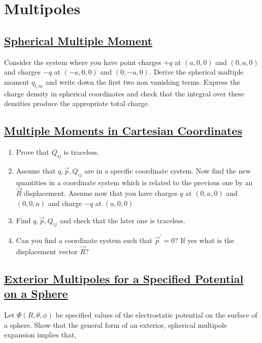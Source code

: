 \section{Multipoles}

\subsection{\hyperref[Spherical Multiple Moment]{Spherical Multiple Moment}}

Consider the system where you have point charges $+q$ at $(a, 0,0)$ and $(0, a, 0)$ and charges $-q$ at $(-a, 0,0)$ and $(0,-a, 0)$. Derive the spherical multiple moment $q_{l, m}$ and write down the first two non vanishing terms. Express the charge density in spherical coordinates and check that the integral over these densities produce the appropriate total charge.

\subsection{\hyperref[Multiple Moments in Cartesian Coordinates]{Multiple Moments in Cartesian Coordinates}}

\begin{enumerate}
	\item Prove that $Q_{i j}$ is traceless.
	\item Assume that $q, \vec{p}, Q_{i j}$ are in a specific coordinate system. Now find the new quantities in a coordinate system which is related to the previous one by an $\vec{R}$ displacement.
	Assume now that you have charges $q$ at $(0, a, 0)$ and $(0,0, a)$ and charge $-q$ at $(a, 0,0)$
	\item Find $q, \vec{p}, Q_{i j}$ and check that the later one is traceless.
	\item Can you find a coordinate system such that $\vec{p}^{\prime}=0 ?$ If yes what is the displacement vector $\vec{R} ?$
\end{enumerate}

\subsection{\hyperref[Exterior Multipoles for a Specified Potential on a Sphere]{Exterior Multipoles for a Specified Potential on a Sphere}} 

Let $\Phi (R, \theta,\phi)$ be specified values of the electrostatic potential on the surface of a sphere. Show that the general form of an exterior, spherical multipole expansion implies that,


